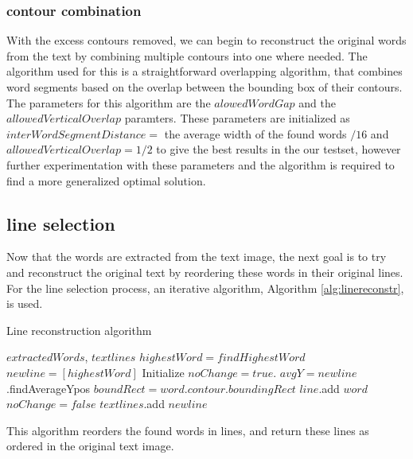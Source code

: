 \documentclass{article}
\begin{document}
\subsubsection{contour combination}
With the excess contours removed, we can begin to reconstruct the original words from the text by combining multiple contours into one where needed.
The algorithm used for this is a straightforward overlapping algorithm, that combines word segments based on the overlap between the bounding box of their contours.
The parameters for this algorithm are the $alowedWordGap$ and the $allowedVerticalOverlap$ paramters.
These parameters are initialized as $interWordSegmentDistance = $ the average width of the found words $ / 16 $ and $allowedVerticalOverlap = 1/2$ to give the best results in the our testset, however further experimentation with these parameters and the algorithm is required to find a more generalized optimal solution.

\subsection{line selection}
Now that the words are extracted from the text image, the next goal is to try and reconstruct the original text by reordering these words in their original lines.
For the line selection process, an iterative algorithm, Algorithm \ref{alg:linereconstr}, is used.
\begin{algorithm}[tb]
   \caption{Line reconstruction algorithm}
   \label{alg:linereconstr}
\begin{algorithmic}
    $extractedWords$, $textlines$
   \REPEAT
        \STATE $highestWord = findHighestWord $
        \STATE $newline = [highestWord]$
        \STATE Initialize $noChange = true$.
        \STATE $avgY= newline$.findAverageYpos
        \REPEAT
            \STATE $boundRect = word.contour.boundingRect$
            \STATE $line$.add $word$
            \STATE $noChange = false$
            \ENDIF
        \ENDFOR
        \STATE $textlines$.add $newline$
\end{algorithmic}
\end{algorithm}
 
This algorithm reorders the found words in lines, and return these lines as ordered in the original text image.
    
\end{document}
